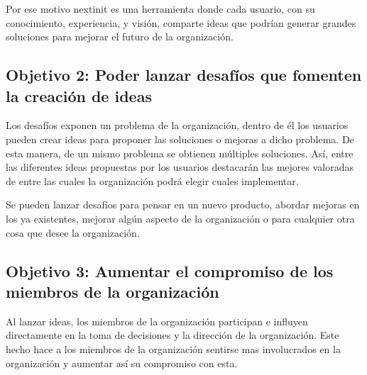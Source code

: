 Por ese motivo nextinit es una herramienta donde cada usuario, con su conocimiento, experiencia, y
visión, comparte ideas que podrían generar grandes soluciones para mejorar el futuro de la organización.

\subsection{Objetivo 2: Poder lanzar desafíos que fomenten la creación de ideas}
Los desafíos exponen un problema de la organización, dentro de él los usuarios pueden crear ideas para
proponer las soluciones o mejoras a dicho problema. De esta manera, de un mismo problema se obtienen múltiples
 soluciones. Así, entre las diferentes ideas propuestas por los usuarios destacarán las mejores valoradas de
 entre las cuales la organización podrá elegir cuales implementar.
 
Se pueden lanzar desafíos para pensar en un nuevo producto, abordar mejoras en los ya existentes, mejorar
 algún aspecto de la organización o para cualquier otra cosa que desee la organización.


\subsection{Objetivo 3: Aumentar el compromiso de los miembros de la organización}

Al lanzar ideas, los miembros de la organización participan e influyen directamente en la toma de 
decisiones y la dirección de la organización. Este hecho hace a los miembros de la organización sentirse
mas involucrados en la organización y aumentar así su compromiso con esta.


